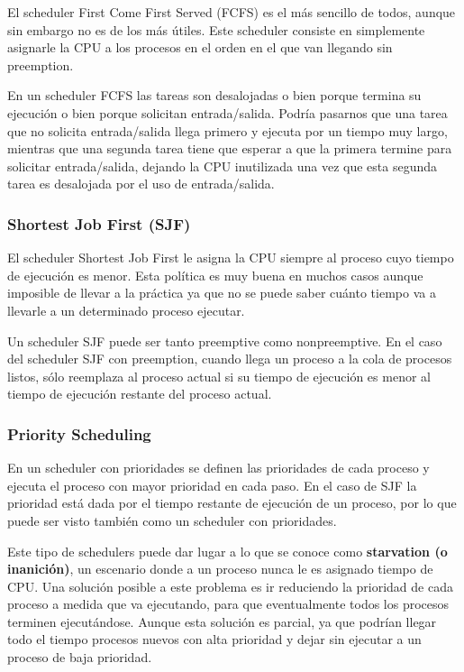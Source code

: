 \documentclass{article}
\begin{document}
El scheduler First Come First Served (FCFS) es el m\'as sencillo de todos, aunque sin embargo no es de los m\'as \'utiles. Este scheduler consiste en simplemente asignarle la CPU a los procesos en el orden en el que van llegando sin preemption.

En un scheduler FCFS las tareas son desalojadas o bien porque termina su ejecuci\'on o bien porque solicitan entrada/salida. Podr\'ia pasarnos que una tarea que no solicita entrada/salida llega primero y ejecuta por un tiempo muy largo, mientras que una segunda tarea tiene que esperar a que la primera termine para solicitar entrada/salida, dejando la CPU inutilizada una vez que esta segunda tarea es desalojada por el uso de entrada/salida.

\subsubsection{Shortest Job First (SJF)}

El scheduler Shortest Job First le asigna la CPU siempre al proceso cuyo tiempo de ejecuci\'on es menor. Esta pol\'itica es muy buena en muchos casos aunque imposible de llevar a la pr\'actica ya que no se puede saber cu\'anto tiempo va a llevarle a un determinado proceso ejecutar.

Un scheduler SJF puede ser tanto preemptive como nonpreemptive. En el caso del scheduler SJF con preemption, cuando llega un proceso a la cola de procesos listos, s\'olo reemplaza al proceso actual si su tiempo de ejecuci\'on es menor al tiempo de ejecuci\'on restante del proceso actual.

\subsubsection{Priority Scheduling}

En un scheduler con prioridades se definen las prioridades de cada proceso y ejecuta el proceso con mayor prioridad en cada paso. En el caso de SJF la prioridad est\'a dada por el tiempo restante de ejecuci\'on de un proceso, por lo que puede ser visto tambi\'en como un scheduler con prioridades.

Este tipo de schedulers puede dar lugar a lo que se conoce como \textbf{starvation (o inanici\'on)}, un escenario donde a un proceso nunca le es asignado tiempo de CPU. Una soluci\'on posible a este problema es ir reduciendo la prioridad de cada proceso a medida que va ejecutando, para que eventualmente todos los procesos terminen ejecut\'andose. Aunque esta soluci\'on es parcial, ya que podr\'ian llegar todo el tiempo procesos nuevos con alta prioridad y dejar sin ejecutar a un proceso de baja prioridad.
\end{document}

